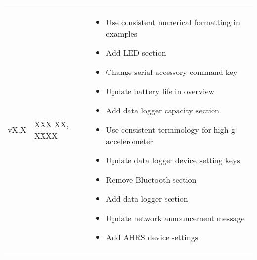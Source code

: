 \begin{longtable}{| >{\centering}p{} | p{} | >{\raggedright\arraybackslash}p{} |}
\begin{itemize}
        \end{itemize}\\
        vX.X & XXX XX, XXXX &
        \begin{itemize}
			\item Use consistent numerical formatting in examples
			\item Add \ac{LED} section
			\item Change serial accessory command key
			\item Update battery life in overview
			\item Add data logger capacity section
			\item Use consistent terminology for high-g accelerometer
			\item Update data logger device setting keys
			\item Remove Bluetooth section
			\item Add data logger section
			\item Update network announcement message
			\item Add AHRS device settings
        \end{itemize}\\
        \arrayrulecolor{gray!50}\hline
    \end{longtable}
\endgroup
